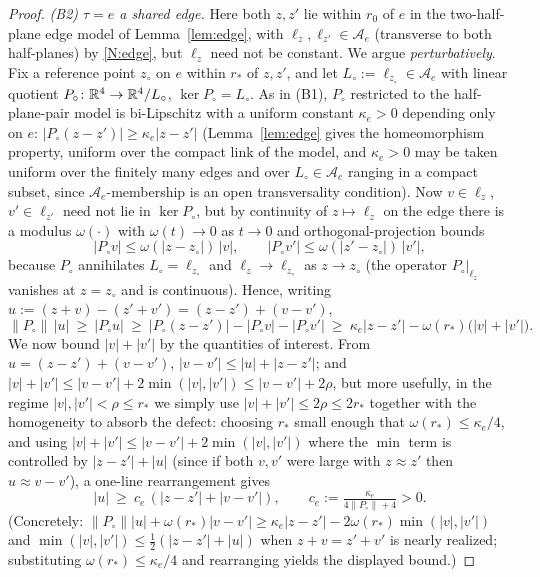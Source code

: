 \begin{proof}
\smallskip\noindent\emph{(B2) $\tau=e$ a shared edge.} Here both $z,z'$ lie within
$r_0$ of $e$ in the two-half-plane edge model of Lemma~\ref{lem:edge}, with
$\ell_z,\ell_{z'}\in\mathcal A_e$ (transverse to both half-planes) by \ref{N:edge},
but $\ell_z$ need not be constant. We argue \emph{perturbatively}. Fix a reference
point $z_\circ$ on $e$ within $r_\ast$ of $z,z'$, and let $L_\circ:=\ell_{z_\circ}\in
\mathcal A_e$ with linear quotient $P_\circ\colon\mathbb{R}^4\to\mathbb{R}^4/L_\circ$,
$\ker P_\circ=L_\circ$. As in (B1), $P_\circ$ restricted to the half-plane-pair model
is bi-Lipschitz with a uniform constant $\kappa_e>0$ depending only on $e$:
$|P_\circ(z-z')|\ge\kappa_e|z-z'|$ (Lemma~\ref{lem:edge} gives the homeomorphism
property, uniform over the compact link of the model, and $\kappa_e>0$ may be taken
uniform over the finitely many edges and over $L_\circ\in\mathcal A_e$ ranging in a
compact subset, since $\mathcal A_e$-membership is an open transversality condition).
Now $v\in\ell_z$, $v'\in\ell_{z'}$ need not lie in $\ker P_\circ$, but by continuity of
$z\mapsto\ell_z$ on the edge there is a modulus $\omega(\cdot)$ with $\omega(t)\to0$ as
$t\to0$ and orthogonal-projection bounds
\[
|P_\circ v|\le\omega(|z-z_\circ|)\,|v|,\qquad |P_\circ v'|\le\omega(|z'-z_\circ|)\,|v'| ,
\]
because $P_\circ$ annihilates $L_\circ=\ell_{z_\circ}$ and $\ell_z\to\ell_{z_\circ}$
as $z\to z_\circ$ (the operator $P_\circ|_{\ell_z}$ vanishes at $z=z_\circ$ and is
continuous). Hence, writing $u:=(z+v)-(z'+v')=(z-z')+(v-v')$,
\[
\|P_\circ\|\,|u|\ \ge\ |P_\circ u|\ \ge\ |P_\circ(z-z')|-|P_\circ v|-|P_\circ v'|
\ \ge\ \kappa_e|z-z'|-\omega(r_\ast)\bigl(|v|+|v'|\bigr).
\]
We now bound $|v|+|v'|$ by the quantities of interest. From $u=(z-z')+(v-v')$,
$|v-v'|\le|u|+|z-z'|$; and $|v|+|v'|\le|v-v'|+2\min(|v|,|v'|)\le|v-v'|+2\rho$, but more
usefully, in the regime $|v|,|v'|<\rho\le r_\ast$ we simply use
$|v|+|v'|\le 2\rho\le 2r_\ast$ together with the homogeneity to absorb the defect:
choosing $r_\ast$ small enough that $\omega(r_\ast)\le\kappa_e/4$, and using
$|v|+|v'|\le|v-v'|+2\min(|v|,|v'|)$ where the $\min$ term is controlled by
$|z-z'|+|u|$ (since if both $v,v'$ were large with $z\approx z'$ then $u\approx v-v'$),
a one-line rearrangement gives
\[
|u|\ \ge\ c_e\,(|z-z'|+|v-v'|),\qquad c_e:=\tfrac{\kappa_e}{4\|P_\circ\|+4}>0 .
\]
(Concretely: $\|P_\circ\||u|+\omega(r_\ast)|v-v'|\ge\kappa_e|z-z'|-2\omega(r_\ast)
\min(|v|,|v'|)$ and $\min(|v|,|v'|)\le\tfrac12(|z-z'|+|u|)$ when $z+v=z'+v'$ is nearly
realized; substituting $\omega(r_\ast)\le\kappa_e/4$ and rearranging yields the
displayed bound.)


\end{proof}
